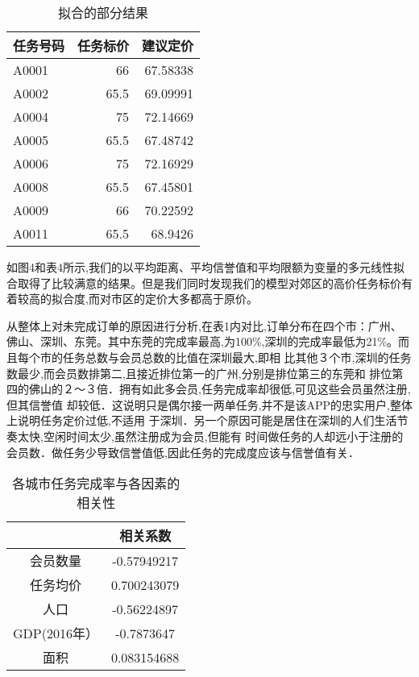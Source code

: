 \documentclass{cumcmthesis}
\begin{document}
\begin{table}[!htbp]
	\caption{拟合的部分结果}\label{tab001} \centering
	\begin{tabular}{lrr}
		\toprule[1.5pt]
		任务号码  & {任务标价} & {建议定价} \\
		\midrule[1pt]
		A0001 & 66    & 67.58338 \\
		A0002 & 65.5  & 69.09991 \\
		A0004 & 75    & 72.14669 \\
		A0005 & 65.5  & 67.48742 \\
		A0006 & 75    & 72.16929 \\
		A0008 & 65.5  & 67.45801 \\
		A0009 & 66    & 70.22592 \\
		A0011 & 65.5  & 68.9426 \\
		\bottomrule[1.5pt]
	\end{tabular}%
\end{table}
如图4和表4所示,我们的以平均距离、平均信誉值和平均限额为变量的多元线性拟合取得了比较满意的结果。但是我们同时发现我们的模型对郊区的高价任务标价有着较高的拟合度,而对市区的定价大多都高于原价。

从整体上对未完成订单的原因进行分析,在表1内对比,订单分布在四个市：广州、佛山、深圳、东莞。其中东莞的完成率最高,为100\%,深圳的完成率最低为21\%。而且每个市的任务总数与会员总数的比值在深圳最大,即相 比其他３个市,深圳的任务数最少,而会员数排第二,且接近排位第一的广州,分别是排位第三的东莞和 排位第四的佛山的２～３倍．拥有如此多会员,任务完成率却很低,可见这些会员虽然注册,但其信誉值 却较低．这说明只是偶尔接一两单任务,并不是该APP的忠实用户,整体上说明任务定价过低,不适用 于深圳．另一个原因可能是居住在深圳的人们生活节奏太快,空闲时间太少,虽然注册成为会员,但能有 时间做任务的人却远小于注册的会员数．做任务少导致信誉值低,因此任务的完成度应该与信誉值有关． 


\begin{table}[!htbp]
	\caption{各城市任务完成率与各因素的相关性}\label{tab001} \centering
	    \begin{tabular}{cc}
	    \toprule[1.5pt]
		 $ $&{相关系数} \\
		\midrule[1pt]
		会员数量  & -0.57949217 \\
		任务均价  & 0.700243079 \\
		人口    & -0.56224897 \\
		GDP(2016年） & -0.7873647 \\
		面积    & 0.083154688 \\
		\bottomrule[1.5pt]
	\end{tabular}%
\end{table}
\end{document}
